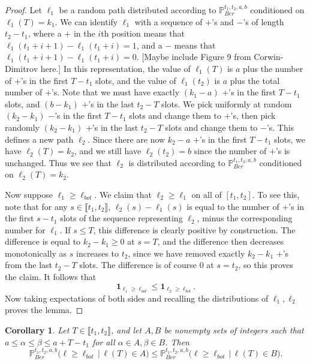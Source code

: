 \documentclass[12pt]{article}
\newtheorem{cor}{Corollary}
\begin{document}
	\begin{proof}
		Let $\ell_1$ be a random path distributed according to $\mathbb{P}^{t_1, t_2, a, b}_{Ber}$ conditioned on $\ell_1(T) = k_1$. We can identify $\ell_1$ with a sequence of $+$'s and $-$'s of length $t_2-t_1$, where a $+$ in the $i$th position means that $\ell_1(t_1+i+1)-\ell_1(t_1+i) = 1$, and a $-$ means that $\ell_1(t_1+i+1)-\ell_1(t_1+i) = 0$. [Maybe include Figure 9 from Corwin-Dimitrov here.] In this representation, the value of $\ell_1(T)$ is $a$ plus the number of $+$'s in the first $T-t_1$ slots, and the value of $\ell_1(t_2)$ is $a$ plus the total number of $+$'s. Note that we must have exactly $(k_1-a)$ $+$'s in the first $T-t_1$ slots, and $(b-k_1)$ $+$'s in the last $t_2-T$ slots. We pick uniformly at random $(k_2-k_1)$ $-$'s in the first $T-t_1$ slots and change them to $+$'s, then pick randomly $(k_2-k_1)$ $+$'s in the last $t_2-T$ slots and change them to $-$'s. This defines a new path $\ell_2$. Since there are now $k_2-a$ $+$'s in the first $T-t_1$ slots, we have $\ell_2(T) = k_2$, and we still have $\ell_2(t_2) = b$ since the number of $+$'s is unchanged. Thus we see that $\ell_2$ is distributed according to $\mathbb{P}^{t_1,t_2,a,b}_{Ber}$ conditioned on $\ell_2(T) = k_2$. 
		
		Now suppose $\ell_1 \geq \ell_{bot}$. We claim that $\ell_2 \geq \ell_1$ on all of $[t_1,t_2]$. To see this, note that for any $s\in\llbracket t_1, t_2\rrbracket$, $\ell_2(s) - \ell_1(s)$ is equal to the number of $+$'s in the first $s-t_1$ slots of the sequence representing $\ell_2$, minus the corresponding number for $\ell_1$. If $s\leq T$, this difference is clearly positive by construction. The difference is equal to $k_2 - k_1 \geq 0$ at $s = T$, and the difference then decreases monotonically as $s$ increases to $t_2$, since we have removed exactly $k_2-k_1$ $+$'s from the last $t_2-T$ slots. The difference is of course 0 at $s = t_2$, so this proves the claim. It follows that
		\[
		\mathbf{1}_{\ell_1 \geq \ell_{bot}} \leq \mathbf{1}_{\ell_2 \geq \ell_{bot}}.
		\]
		Now taking expectations of both sides and recalling the distributions of $\ell_1,\ell_2$ proves the lemma.
	\end{proof}


	\begin{cor}\label{setpathcounting}
		Let $T\in\llbracket t_1, t_2\rrbracket$, and let $A, B$ be nonempty sets of integers such that $a \leq \alpha \leq \beta \leq a+T-t_1$ for all $\alpha\in A, \beta\in B$. Then
		\[
		\mathbb{P}^{t_1, t_2, a, b}_{Ber}\big(\ell \geq \ell_{bot}\,\big|\,\ell(T) \in A\big) \leq \mathbb{P}^{t_1, t_2, a, b}_{Ber}\big(\ell \geq \ell_{bot}\,\big|\,\ell(T) \in B\big).
		\]
	\end{cor}
\end{document}
